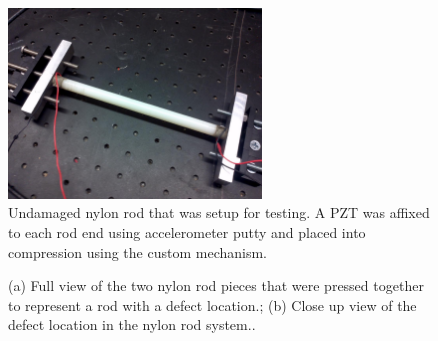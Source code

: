 \begin{figure}[ht!]
\centering
\includegraphics[width=0.6\textwidth]{eps_pics/nylonUncrackedFull}
\caption{Undamaged nylon rod that was setup for testing. A PZT was affixed to each rod end using accelerometer putty and placed into compression using the custom mechanism.
 	 \label{fig:nylonUncrackedFull}} 
\end{figure}

\begin{figure}
\begin{subfigmatrix}{2}
\end{subfigmatrix}

   \caption
   { \label{fig:nylonCrack}
(a) Full view of the two nylon rod pieces that were pressed together to represent a rod with a defect location.;
(b) Close up view of the defect location in the nylon rod system..
 }
   \end{figure}
   
